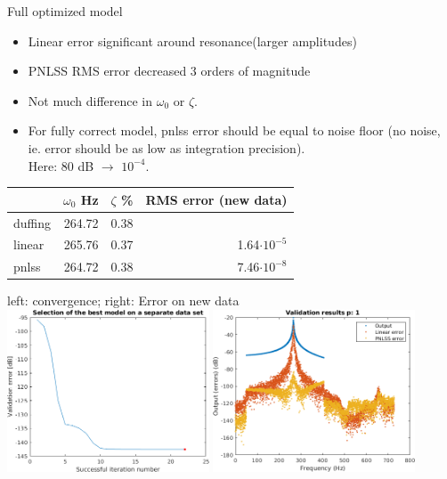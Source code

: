 \documentclass[9pt]{beamer}
\begin{document}
\begin{frame}{Full optimized model}
  \begin{itemize}
  \item Linear error significant around resonance(larger amplitudes)
  \item PNLSS RMS error decreased 3 orders of magnitude
  \item Not much difference in $\omega_0$ or $\zeta$.
  \item For fully correct model, pnlss error should be equal to noise floor (no
    noise, ie. error should be as low as integration precision).\\
    Here: 80 dB $\rightarrow$ $10^{-4}$.
  \end{itemize}

  \begin{center}
  \begin{tabular}{l|r|r|r}
    & $\omega_0$ Hz & $\zeta$ \% & \small{RMS error (new data)}\\
    \hline
    duffing & 264.72 & 0.38 &\\
    linear & 265.76 & 0.37  & 1.64$\cdot 10^{-5}$ \\
    pnlss & 264.72 & 0.38 & 7.46$\cdot 10^{-8}$
  \end{tabular}
  \vspace{2mm}

    left: convergence; right: Error on new data\\
    \includegraphics[width=0.45\textwidth]{fig/b1_A10_ms_full_convergence}
    \includegraphics[width=0.45\textwidth]{fig/b1_A10_ms_full_val_err_p1}
  \end{center}
\end{frame}
\end{document}
